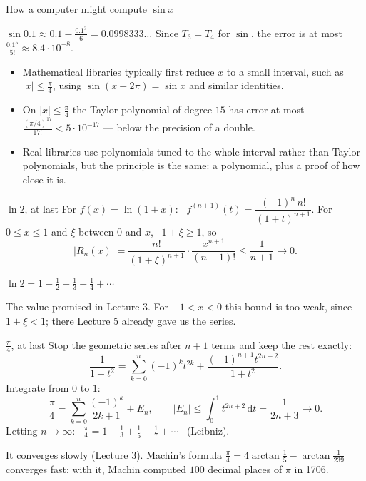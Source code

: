 \documentclass[10pt]{wosm-slides}
\newcommand{\dt}{\,\mathrm{d}t}
\begin{document}
\begin{frame}{How a computer might compute $\sin x$}
  \begin{example}
    $\sin 0.1 \approx 0.1 - \frac{0.1^3}{6} = 0.0998333\ldots$
    Since $T_3 = T_4$ for $\sin$, the error is at most $\frac{0.1^5}{5!} \approx 8.4 \cdot 10^{-8}$.
  \end{example}
  \pause
  \begin{itemize}
    \item Mathematical libraries typically first reduce $x$ to a small interval, such as
      $|x| \le \frac\pi4$, using $\sin(x + 2\pi) = \sin x$ and similar identities.
    \item On $|x| \le \frac\pi4$ the Taylor polynomial of degree $15$ has error at most
      $\frac{(\pi/4)^{17}}{17!} < 5 \cdot 10^{-17}$ --- below the precision of a double.
    \item Real libraries use polynomials tuned to the whole interval rather than Taylor
      polynomials, but the principle is the same: a polynomial, plus a proof of how close it is.
  \end{itemize}
\end{frame}

\begin{frame}{$\ln 2$, at last}
  For $f(x) = \ln(1 + x)$: \ $f^{(n+1)}(t) = \dfrac{(-1)^n\, n!}{(1 + t)^{n+1}}$.
  \pause
  For $0 \le x \le 1$ and $\xi$ between $0$ and $x$, \ $1 + \xi \ge 1$, so
  \[ |R_n(x)| = \frac{n!}{(1+\xi)^{n+1}} \cdot \frac{x^{n+1}}{(n+1)!} \le \frac{1}{n+1} \to 0 . \]
  \pause
  \begin{theorem}
    $\displaystyle \ln 2 = 1 - \frac12 + \frac13 - \frac14 + \cdots$
  \end{theorem}
  {\small The value promised in Lecture 3. For $-1 < x < 0$ this bound is too weak, since
  $1 + \xi < 1$; there Lecture 5 already gave us the series.\par}
\end{frame}

\begin{frame}{$\frac\pi4$, at last}
  Stop the geometric series after $n + 1$ terms and keep the rest exactly:
  \[ \frac{1}{1 + t^2} = \sum_{k=0}^{n} (-1)^k t^{2k} + \frac{(-1)^{n+1} t^{2n+2}}{1 + t^2} . \]
  \pause
  Integrate from $0$ to $1$:
  \[ \frac{\pi}{4} = \sum_{k=0}^{n} \frac{(-1)^k}{2k+1} + E_n, \qquad
     |E_n| \le \int_0^1 t^{2n+2} \dt = \frac{1}{2n+3} \to 0 . \]
  Letting $n \to \infty$: \ $\displaystyle\frac\pi4 = 1 - \frac13 + \frac15 - \frac17 + \cdots$
  \ (Leibniz).
  {\small It converges slowly (Lecture 3). Machin's formula
  $\frac\pi4 = 4 \arctan\frac15 - \arctan\frac{1}{239}$ converges fast: with it, Machin computed
  $100$ decimal places of $\pi$ in 1706.\par}
\end{frame}
\end{document}
